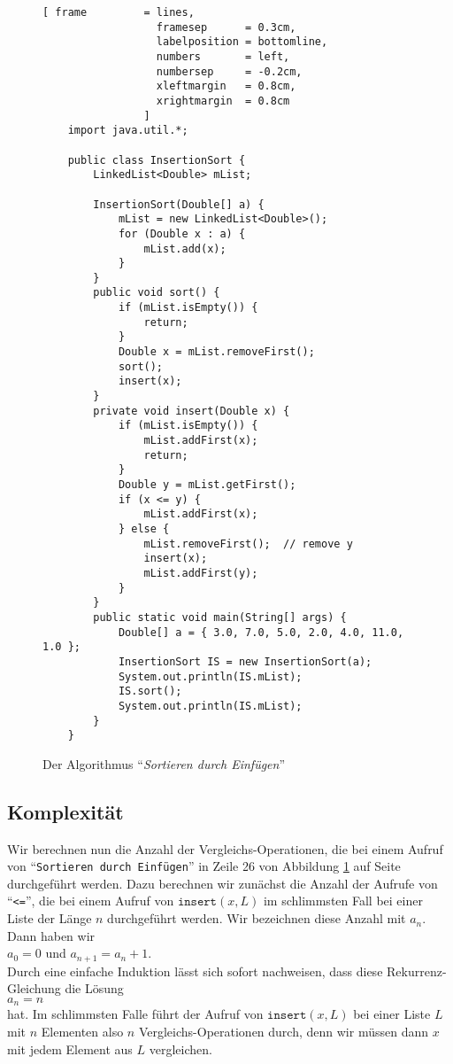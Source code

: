 \begin{figure}[!ht]
  \centering
\begin{Verbatim}[ frame         = lines, 
                  framesep      = 0.3cm, 
                  labelposition = bottomline,
                  numbers       = left,
                  numbersep     = -0.2cm,
                  xleftmargin   = 0.8cm,
                  xrightmargin  = 0.8cm
                ]
    import java.util.*;
    
    public class InsertionSort {
        LinkedList<Double> mList;
        
        InsertionSort(Double[] a) {
            mList = new LinkedList<Double>();
            for (Double x : a) {
                mList.add(x);
            }
        }    
        public void sort() {
            if (mList.isEmpty()) {
                return;
            }
            Double x = mList.removeFirst();
            sort();
            insert(x);
        }
        private void insert(Double x) {
            if (mList.isEmpty()) {
                mList.addFirst(x);
                return;
            }
            Double y = mList.getFirst();
            if (x <= y) {
                mList.addFirst(x);
            } else {
                mList.removeFirst();  // remove y
                insert(x);
                mList.addFirst(y);
            }
        }        
        public static void main(String[] args) {
            Double[] a = { 3.0, 7.0, 5.0, 2.0, 4.0, 11.0, 1.0 };
            InsertionSort IS = new InsertionSort(a);
            System.out.println(IS.mList);
            IS.sort();
            System.out.println(IS.mList);
        }
    }
\end{Verbatim}
\vspace*{-0.3cm}
  \caption{Der Algorithmus ``\emph{Sortieren durch Einf\"ugen}''}
  \label{fig:insertion-sort}
\end{figure} 

\subsection{Komplexit\"at}
Wir berechnen nun die Anzahl der Vergleichs-Operationen, die bei einem Aufruf von
``\texttt{Sortieren durch Einf\"ugen}'' in Zeile 26 von Abbildung
\ref{fig:insertion-sort} auf Seite \pageref{fig:insertion-sort} durchgef\"uhrt werden. Dazu
berechnen wir zun\"achst die Anzahl der Aufrufe von ``\texttt{<=}'', die bei einem Aufruf
von $\texttt{insert}(x,L)$ im schlimmsten Fall bei einer Liste der L\"ange $n$
durchgef\"uhrt werden.  Wir bezeichnen diese Anzahl mit $a_n$. Dann haben wir \\[0.2cm]
\hspace*{1.3cm} $a_0 = 0$ \quad und \quad $a_{n+1} = a_n + 1$. \\[0.2cm]
Durch eine einfache Induktion l\"asst sich sofort nachweisen, dass diese Rekurrenz-Gleichung
 die L\"osung \\[0.2cm]
\hspace*{1.3cm} $a_n = n$ \\[0.2cm]
hat.  Im schlimmsten Falle f\"uhrt der Aufruf von $\mathtt{insert}(x,L)$ bei einer Liste $L$ mit
$n$ Elementen also $n$ Vergleichs-Operationen durch, denn wir m\"ussen dann $x$ mit jedem
Element aus $L$ vergleichen.  

